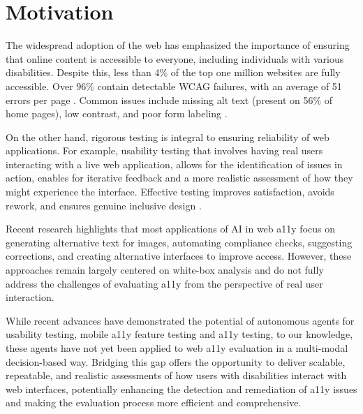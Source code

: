
\section{Motivation}

The widespread adoption of the web has emphasized the importance of ensuring that online content is accessible to everyone, including individuals with various disabilities\cite{abu2023web}. Despite this, less than 4\% of the top one million websites are fully accessible. Over 96\% contain detectable \ac{WCAG} failures, with an average of 51 errors per page \cite{webaimmillion2025}. Common issues include missing alt text (present on 56\% of home pages), low contrast, and poor form labeling \cite{audioeye2024}.

On the other hand, rigorous testing is integral to ensuring reliability of web applications. For example, usability testing that involves having real users interacting with a live web application, allows for the identification of issues in action, enables for iterative feedback and a more realistic assessment of how they might experience the interface. Effective testing improves satisfaction, avoids rework, and ensures genuine inclusive design \cite{accessdesign2025}.


Recent research highlights that most applications of \ac{AI} in web \ac{a11y} focus on generating alternative text for images, automating compliance checks, suggesting corrections, and creating alternative interfaces to improve access\cite{vera2025towards}. However, these approaches remain largely centered on white-box analysis and do not fully address the challenges of evaluating \ac{a11y} from the perspective of real user interaction. 

While recent advances have demonstrated the potential of autonomous agents for usability testing\cite{lu2025uxagent}, mobile \ac{a11y} feature testing\cite{taeb2024axnav} and a11y testing\cite{zhong2025screenaudit}, to our knowledge, these agents have not yet been applied to web \ac{a11y} evaluation in a multi-modal decision-based way. Bridging this gap offers the opportunity to deliver scalable, repeatable, and realistic assessments of how users with disabilities interact with web interfaces, potentially enhancing the detection and remediation of \ac{a11y} issues and making the evaluation process more efficient and comprehensive.

